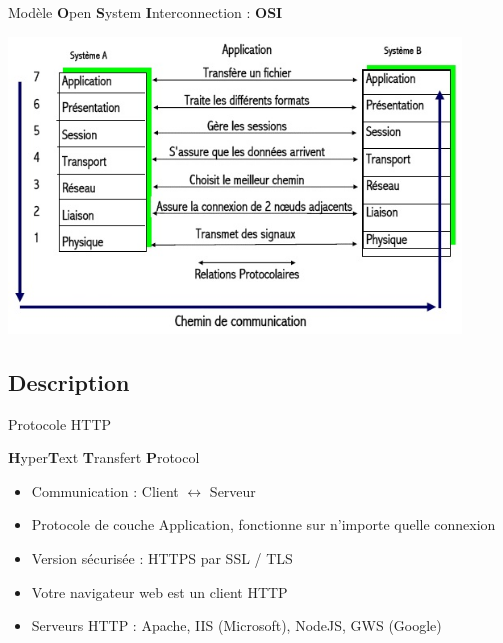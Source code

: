 \begin{frame}{Modèle \textbf{O}pen \textbf{S}ystem \textbf{I}nterconnection : \textbf{OSI}}

    \begin{center}
        \includegraphics[width=0.9\textwidth]{img_http/OSI.jpg}
    \end{center}

\end{frame}




\subsection{Description}

\begin{frame}{Protocole HTTP}
	
	\begin{center}

		{\Large \textbf{H}yper\textbf{T}ext \textbf{T}ransfert \textbf{P}rotocol}  \vspace{2em}

		\begin{itemize}
			\item Communication : Client $\leftrightarrow$ Serveur\\
			\item Protocole de couche Application, fonctionne sur n'importe quelle connexion\\
			\item Version sécurisée : HTTPS par SSL / TLS
			\item Votre navigateur web est un client HTTP
			\item Serveurs HTTP : Apache, IIS (Microsoft), NodeJS, GWS (Google)
		\end{itemize}
	\end{center}

\end{frame}




